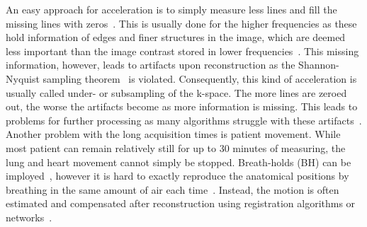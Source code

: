 An easy approach for acceleration is to simply measure less lines and fill the missing lines with zeros~\cite{DeepMRIReconstructionSubsampling}. This is usually done for the higher frequencies as these hold information of edges and finer structures in the image, which are deemed less important than the image contrast stored in lower frequencies~\cite{AdvancesPI}. This missing information, however, leads to artifacts upon reconstruction as the Shannon-Nyquist sampling theorem~\cite{Shannon} is violated. Consequently, this kind of acceleration is usually called under- or subsampling of the k-space. The more lines are zeroed out, the worse the artifacts become as more information is missing. This leads to problems for further processing as many algorithms struggle with these artifacts~\cite{DeepMRIReconstructionSubsampling}. \\
Another problem with the long acquisition times is patient movement. While most patient can remain relatively still for up to 30 minutes of measuring, the lung and heart movement cannot simply be stopped. Breath-holds (BH) can be imployed~\cite{Zaitsev2015}, however it is hard to exactly reproduce the anatomical positions by breathing in the same amount of air each time~\cite{Lin2022}. Instead, the motion is often estimated and compensated after reconstruction using registration algorithms or networks~\cite{Kuestner2022,Chen2023,GRICS}.

